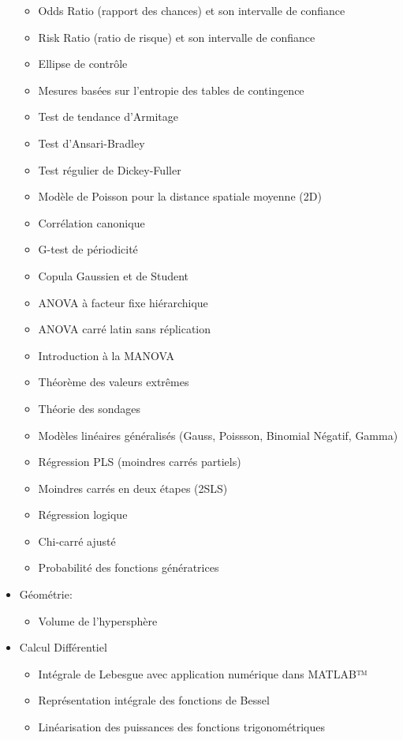 \begin{itemize}
\begin{itemize}
				\item Odds Ratio (rapport des chances) et son intervalle de confiance
				\item Risk Ratio (ratio de risque) et son intervalle de confiance
				\item Ellipse de contrôle
				\item Mesures basées sur l'entropie des tables de contingence
				\item Test de tendance d'Armitage
				\item Test d'Ansari-Bradley
				\item Test régulier de Dickey-Fuller
				\item Modèle de Poisson pour la distance spatiale moyenne (2D)
				\item Corrélation canonique
				\item G-test de périodicité
				\item Copula Gaussien et de Student
				\item ANOVA à facteur fixe hiérarchique
				\item ANOVA carré latin sans réplication
				\item Introduction à la MANOVA
				\item Théorème des valeurs extrêmes
				\item Théorie des sondages
				\item Modèles linéaires généralisés (Gauss, Poissson, Binomial Négatif, Gamma)
				\item Régression PLS (moindres carrés partiels)
				\item Moindres carrés en deux étapes (2SLS)
				\item Régression logique
				\item Chi-carré ajusté
				\item Probabilité des fonctions génératrices
			\end{itemize}
		\item Géométrie:
			\begin{itemize}
				\item Volume de l'hypersphère
			\end{itemize}
		\item Calcul Différentiel
			\begin{itemize}
				\item Intégrale de Lebesgue avec application numérique dans MATLAB™
				\item Représentation intégrale des fonctions de Bessel
				\item Linéarisation des puissances des fonctions trigonométriques

\end{itemize}
\end{itemize}
